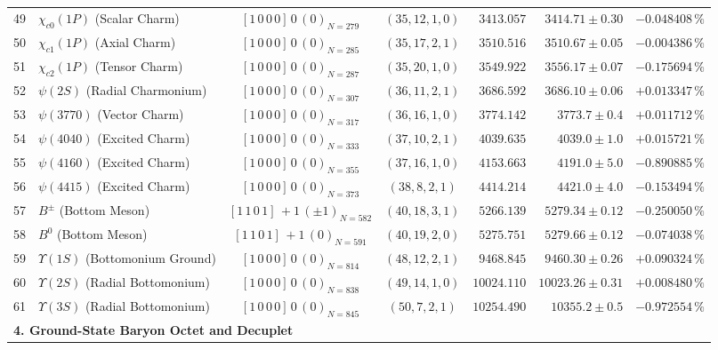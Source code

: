 \documentclass[
    12pt,
    a4paper,
    headings=normal,
    twoside=false,
    open=any,
    parskip=half
]{scrbook}
\begin{document}
\begin{longtable}{clccrrr}
49 & $\chi_{c0}(1P)$ (Scalar Charm) & $[1 \, 0 \, 0 \, 0] \, 0 \, (0)_{N=279}$ & $(35, 12, 1, 0)$ & $3413.057$ & $3414.71 \pm 0.30$ & $-0.048408\,\%$ \\
50 & $\chi_{c1}(1P)$ (Axial Charm) & $[1 \, 0 \, 0 \, 0] \, 0 \, (0)_{N=285}$ & $(35, 17, 2, 1)$ & $3510.516$ & $3510.67 \pm 0.05$ & $-0.004386\,\%$ \\
51 & $\chi_{c2}(1P)$ (Tensor Charm) & $[1 \, 0 \, 0 \, 0] \, 0 \, (0)_{N=287}$ & $(35, 20, 1, 0)$ & $3549.922$ & $3556.17 \pm 0.07$ & $-0.175694\,\%$ \\
52 & $\psi(2S)$ (Radial Charmonium) & $[1 \, 0 \, 0 \, 0] \, 0 \, (0)_{N=307}$ & $(36, 11, 2, 1)$ & $3686.592$ & $3686.10 \pm 0.06$ & $+0.013347\,\%$ \\
53 & $\psi(3770)$ (Vector Charm) & $[1 \, 0 \, 0 \, 0] \, 0 \, (0)_{N=317}$ & $(36, 16, 1, 0)$ & $3774.142$ & $3773.7 \pm 0.4$ & $+0.011712\,\%$ \\
54 & $\psi(4040)$ (Excited Charm) & $[1 \, 0 \, 0 \, 0] \, 0 \, (0)_{N=333}$ & $(37, 10, 2, 1)$ & $4039.635$ & $4039.0 \pm 1.0$ & $+0.015721\,\%$ \\
55 & $\psi(4160)$ (Excited Charm) & $[1 \, 0 \, 0 \, 0] \, 0 \, (0)_{N=355}$ & $(37, 16, 1, 0)$ & $4153.663$ & $4191.0 \pm 5.0$ & $-0.890885\,\%$ \\
56 & $\psi(4415)$ (Excited Charm) & $[1 \, 0 \, 0 \, 0] \, 0 \, (0)_{N=373}$ & $(38, 8, 2, 1)$ & $4414.214$ & $4421.0 \pm 4.0$ & $-0.153494\,\%$ \\
57 & $B^\pm$ (Bottom Meson) & $[1 \, 1 \, 0 \, 1] \, +1 \, (\pm 1)_{N=582}$ & $(40, 18, 3, 1)$ & $5266.139$ & $5279.34 \pm 0.12$ & $-0.250050\,\%$ \\
58 & $B^0$ (Bottom Meson) & $[1 \, 1 \, 0 \, 1] \, +1 \, (0)_{N=591}$ & $(40, 19, 2, 0)$ & $5275.751$ & $5279.66 \pm 0.12$ & $-0.074038\,\%$ \\
59 & $\Upsilon(1S)$ (Bottomonium Ground) & $[1 \, 0 \, 0 \, 0] \, 0 \, (0)_{N=814}$ & $(48, 12, 2, 1)$ & $9468.845$ & $9460.30 \pm 0.26$ & $+0.090324\,\%$ \\
60 & $\Upsilon(2S)$ (Radial Bottomonium) & $[1 \, 0 \, 0 \, 0] \, 0 \, (0)_{N=838}$ & $(49, 14, 1, 0)$ & $10024.110$ & $10023.26 \pm 0.31$ & $+0.008480\,\%$ \\
61 & $\Upsilon(3S)$ (Radial Bottomonium) & $[1 \, 0 \, 0 \, 0] \, 0 \, (0)_{N=845}$ & $(50, 7, 2, 1)$ & $10254.490$ & $10355.2 \pm 0.5$ & $-0.972554\,\%$ \\\midrule
\multicolumn{7}{l}{\textsf{\textbf{\color{maincolor!90!black}4. Ground-State Baryon Octet and Decuplet}}} \\\midrule

\end{longtable}
\end{document}
